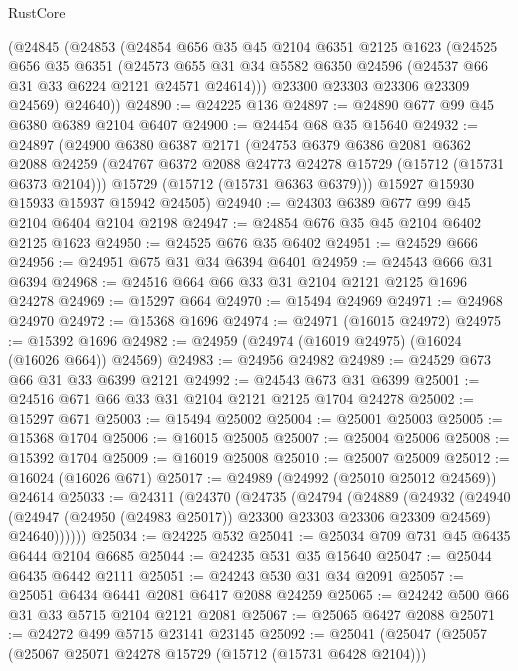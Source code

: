 \begin{lexlean}{RustCore}
\begin{coremodule}
    (@24845
      (@24853
        (@24854
          @656
          @35
          @45
          @2104
          @6351
          @2125
          @1623
          (@24525
            @656
            @35
            @6351
            (@24573 @655 @31 @34 @5582 @6350 @24596 (@24537 @66 @31 @33 @6224 @2121 @24571 @24614)))
          @23300
          @23303
          @23306
          @23309
          @24569)
        @24640))
@24890 := @24225 @136
@24897 := @24890 @677 @99 @45 @6380 @6389 @2104 @6407
@24900 := @24454 @68 @35 @15640
@24932 := @24897
    (@24900
      @6380
      @6387
      @2171
      (@24753
        @6379
        @6386
        @2081
        @6362
        @2088
        @24259
        (@24767 @6372 @2088 @24773 @24278 @15729 (@15712 (@15731 @6373 @2104)))
        @15729
        (@15712 (@15731 @6363 @6379)))
      @15927
      @15930
      @15933
      @15937
      @15942
      @24505)
@24940 := @24303 @6389 @677 @99 @45 @2104 @6404 @2104 @2198
@24947 := @24854 @676 @35 @45 @2104 @6402 @2125 @1623
@24950 := @24525 @676 @35 @6402
@24951 := @24529 @666
@24956 := @24951 @675 @31 @34 @6394 @6401
@24959 := @24543 @666 @31 @6394
@24968 := @24516 @664 @66 @33 @31 @2104 @2121 @2125 @1696 @24278
@24969 := @15297 @664
@24970 := @15494 @24969
@24971 := @24968 @24970
@24972 := @15368 @1696
@24974 := @24971 (@16015 @24972)
@24975 := @15392 @1696
@24982 := @24959 (@24974 (@16019 @24975) (@16024 (@16026 @664)) @24569)
@24983 := @24956 @24982
@24989 := @24529 @673 @66 @31 @33 @6399 @2121
@24992 := @24543 @673 @31 @6399
@25001 := @24516 @671 @66 @33 @31 @2104 @2121 @2125 @1704 @24278
@25002 := @15297 @671
@25003 := @15494 @25002
@25004 := @25001 @25003
@25005 := @15368 @1704
@25006 := @16015 @25005
@25007 := @25004 @25006
@25008 := @15392 @1704
@25009 := @16019 @25008
@25010 := @25007 @25009
@25012 := @16024 (@16026 @671)
@25017 := @24989 (@24992 (@25010 @25012 @24569)) @24614
@25033 := @24311
    (@24370
      (@24735
        (@24794
          (@24889
            (@24932
              (@24940
                (@24947 (@24950 (@24983 @25017)) @23300 @23303 @23306 @23309 @24569)
                @24640))))))
@25034 := @24225 @532
@25041 := @25034 @709 @731 @45 @6435 @6444 @2104 @6685
@25044 := @24235 @531 @35 @15640
@25047 := @25044 @6435 @6442 @2111
@25051 := @24243 @530 @31 @34 @2091
@25057 := @25051 @6434 @6441 @2081 @6417 @2088 @24259
@25065 := @24242 @500 @66 @31 @33 @5715 @2104 @2121 @2081
@25067 := @25065 @6427 @2088
@25071 := @24272 @499 @5715 @23141 @23145
@25092 := @25041
    (@25047
      (@25057
        (@25067 @25071 @24278 @15729 (@15712 (@15731 @6428 @2104)))

\end{coremodule}
\end{lexlean}
